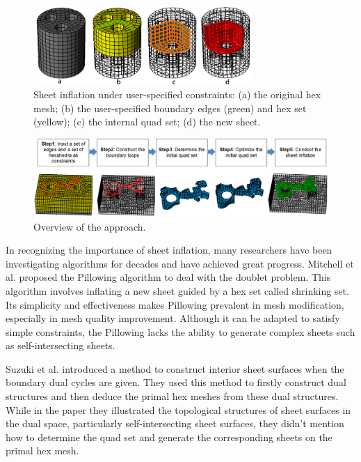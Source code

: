 \documentclass[final,5p,times,twocolumn]{elsarticle}
\begin{document}
\begin{figure}[htbp]
\begin{center}
\includegraphics[height=3cm]{figures/sheet_proc_constr.png}
\caption{Sheet inflation under user-specified constraints: (a) the original hex mesh; (b) the user-specified boundary edges (green) and hex set (yellow); (c) the internal quad set; (d) the new sheet.}
\label{fig:sheet_proc_constr}
\end{center}
\end{figure}


\begin{figure}[htbp]
\begin{center}
\includegraphics[width=18cm]{figures/overview2.png}
\caption{Overview of the approach.}
\label{fig:overview}
\end{center}
\end{figure}

In recognizing the importance of sheet inflation, many researchers have been investigating algorithms for decades and have achieved great progress. Mitchell et al. proposed the Pillowing algorithm to deal with the doublet problem\cite{Mitchell:1995wa}. This algorithm involves inflating a new sheet guided by a hex set called shrinking set. Its simplicity and effectiveness makes Pillowing prevalent in mesh modification, especially in mesh quality improvement. Although it can be adapted to satisfy simple constraints, the Pillowing lacks the ability to generate complex sheets such as self-intersecting sheets.

Suzuki et al. introduced a method to construct interior sheet surfaces when the boundary dual cycles are given\cite{Suzuki:2010hn}. They used this method to firstly construct dual structures and then deduce the primal hex meshes from these dual structures. While in the paper they illustrated the topological structures of sheet surfaces in the dual space, particularly self-intersecting sheet surfaces, they didn't mention how to determine the quad set and generate the corresponding sheets on the primal hex mesh.
\end{document}
